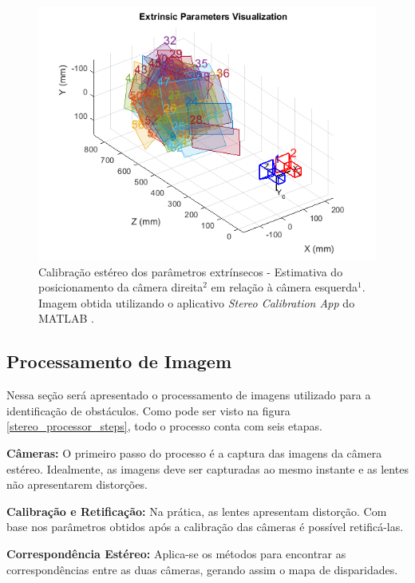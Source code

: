 \begin{figure}[H]
 	\centering
 	\includegraphics[scale=0.70]{./Resources/stereo_calib_extrinsic.png}
 	\caption{Calibração estéreo dos parâmetros extrínsecos - Estimativa do posicionamento da câmera direita$^2$ em relação à câmera esquerda$^1$. Imagem obtida utilizando o aplicativo \textit{Stereo Calibration App} do MATLAB \cite{MatlabStereoApp}.}
 	\label{stereo_calib_extrinsic}
\end{figure}

\subsection{Processamento de Imagem}

Nessa seção será apresentado o processamento de imagens utilizado para a identificação de obstáculos. Como pode ser visto na figura \ref{stereo_processor_steps}, todo o processo conta com seis etapas.

\textbf{Câmeras:} O primeiro passo do processo é a captura das imagens da câmera estéreo. Idealmente, as imagens deve ser capturadas ao mesmo instante e as lentes não apresentarem distorções.   

\textbf{Calibração e Retificação:} Na prática, as lentes apresentam distorção. Com base nos parâmetros obtidos após a calibração das câmeras é possível retificá-las. 

\textbf{Correspondência Estéreo:} Aplica-se os métodos para encontrar as correspondências entre as duas câmeras, gerando assim o mapa de disparidades.

